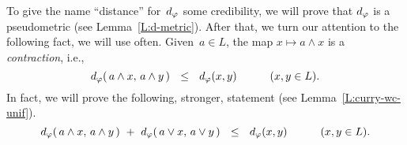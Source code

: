 \documentclass[main.tex]{subfiles}
\begin{document}
To give the name ``distance'' for~$d_{\smash{\varphi}}$ some credibility,
we will prove that $d_{\smash{\varphi}}$ 
is a pseudometric (see Lemma~\ref{L:d-metric}).
After that,
we turn our attention to the following fact,
we will use often.
Given~$a\in L$, the map $x\mapsto a\wedge x$ is a \emph{contraction}, i.e.,
\begin{equation*}
d_{\smash{\varphi}}(\,a\wedge x,\, a\wedge y\,)
\ \ \leq\ \ d_{\smash{\varphi}}(x,y)
\qquad\quad(x,y\in L).
\end{equation*}
In fact,
we will prove the following, stronger, statement
(see Lemma~\ref{L:curry-wc-unif}).
\begin{equation*}
\ld\varphi(\,a\wedge x,\, a\wedge y\,) \ +\ 
\ld\varphi(\,a\vee x,\, a\vee y\,)
\ \ \leq\ \ \ld\varphi(x,y)
\qquad\quad(x,y\in L).
\end{equation*}
\end{document}

